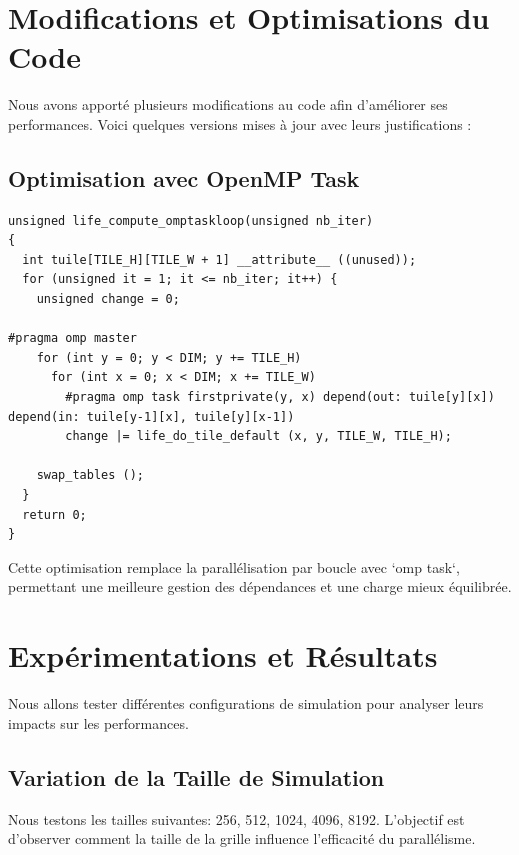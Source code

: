 \documentclass{article}
\begin{document}
\section{Modifications et Optimisations du Code}

Nous avons apporté plusieurs modifications au code afin d'améliorer ses performances. Voici quelques versions mises à jour avec leurs justifications :

\subsection{Optimisation avec OpenMP Task}

\begin{lstlisting}
unsigned life_compute_omptaskloop(unsigned nb_iter)
{
  int tuile[TILE_H][TILE_W + 1] __attribute__ ((unused));
  for (unsigned it = 1; it <= nb_iter; it++) {
    unsigned change = 0;

#pragma omp master
    for (int y = 0; y < DIM; y += TILE_H)
      for (int x = 0; x < DIM; x += TILE_W)
        #pragma omp task firstprivate(y, x) depend(out: tuile[y][x]) depend(in: tuile[y-1][x], tuile[y][x-1])
        change |= life_do_tile_default (x, y, TILE_W, TILE_H);

    swap_tables ();
  }
  return 0;
}
\end{lstlisting}

Cette optimisation remplace la parallélisation par boucle avec `omp task`, permettant une meilleure gestion des dépendances et une charge mieux équilibrée.

\section{Expérimentations et Résultats}

Nous allons tester différentes configurations de simulation pour analyser leurs impacts sur les performances.

\subsection{Variation de la Taille de Simulation}
Nous testons les tailles suivantes: 256, 512, 1024, 4096, 8192. L'objectif est d'observer comment la taille de la grille influence l'efficacité du parallélisme.
\end{document}
